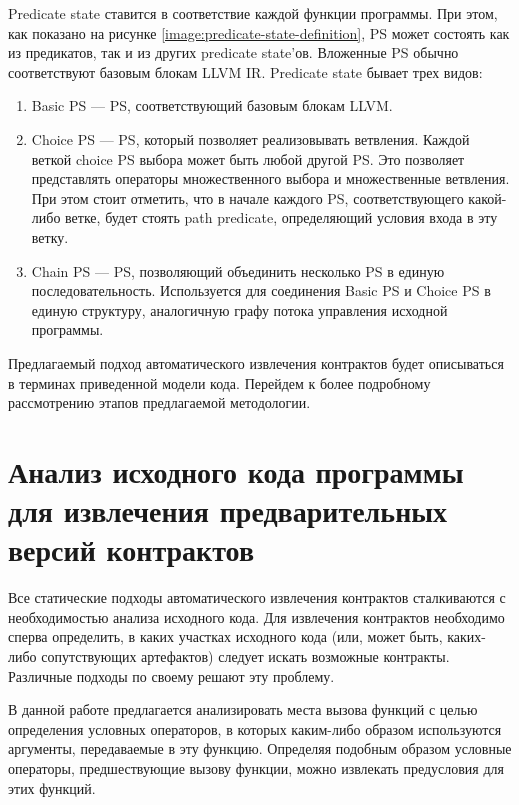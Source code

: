 Predicate state ставится в соответствие каждой функции программы. При этом, как показано на рисунке \ref{image:predicate-state-definition}, PS может состоять как из предикатов, так и из других predicate state'ов. Вложенные PS обычно соответствуют базовым блокам LLVM IR. Predicate state бывает трех видов:
\begin{enumerate}
\item Basic PS --- PS, соответствующий базовым блокам LLVM.
\item Choice PS --- PS, который позволяет реализовывать ветвления. Каждой веткой choice PS выбора может быть любой другой PS. Это позволяет представлять операторы множественного выбора и множественные ветвления. При этом стоит отметить, что в начале каждого PS, соответствующего какой-либо ветке, будет стоять path predicate, определяющий условия входа в эту ветку.
\item Chain PS --- PS, позволяющий объединить несколько PS в единую последовательность. Используется для соединения Basic PS и Choice PS в единую структуру, аналогичную графу потока управления исходной программы.
\end{enumerate}

Предлагаемый подход автоматического извлечения контрактов будет описываться в терминах приведенной модели кода. Перейдем к более подробному рассмотрению этапов предлагаемой методологии.

\section{Анализ исходного кода программы для извлечения предварительных версий контрактов}
\label{section:analysis}
Все статические подходы автоматического извлечения контрактов сталкиваются с необходимостью анализа исходного кода. Для извлечения контрактов необходимо сперва определить, в каких участках исходного кода (или, может быть, каких-либо сопутствующих артефактов) следует искать возможные контракты. Различные подходы по своему решают эту проблему.

В данной работе предлагается анализировать места вызова функций с целью определения условных операторов, в которых каким-либо образом используются аргументы, передаваемые в эту функцию. Определяя подобным образом условные операторы, предшествующие вызову функции, можно извлекать предусловия для этих функций.

